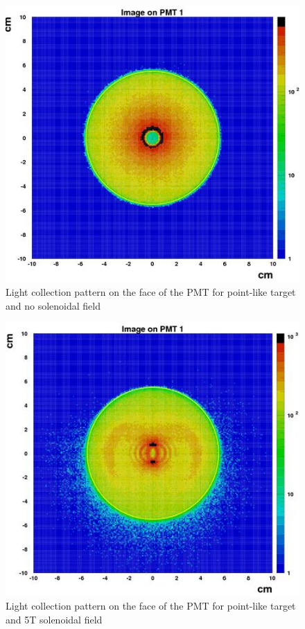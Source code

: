 \begin{figure}[!ht]
    \centering
    \includegraphics[width=1.0\linewidth,trim={0.0cm 0.0cm 0.0cm 0.0cm},clip]{images/Point_Targ_Zero_Field_PMT.jpg}
    \caption{Light collection pattern on the face of the PMT for point-like target and no solenoidal field}
    \label{fig:Point_Targ_Zero_Field_PMT}
\end{figure}

\begin{figure}[!ht]
    \centering
    \includegraphics[width=1.0\linewidth,trim={0.0cm 0.0cm 0.0cm 0.0cm},clip]{images/Point_Targ_5T_Field_PMT.jpg}
    \caption{Light collection pattern on the face of the PMT for point-like target and 5T solenoidal field}
    \label{fig:Point_Targ_5T_Field_PMT}
\end{figure}

